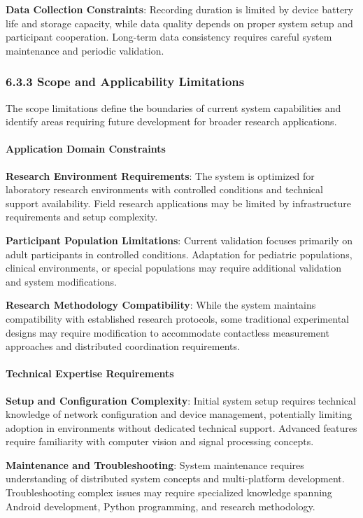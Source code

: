 \documentclass[11pt,a4paper]{article}
\begin{document}
\textbf{Data Collection Constraints}: Recording duration is limited by device battery life and storage capacity, while data
quality depends on proper system setup and participant cooperation. Long-term data consistency requires careful system
maintenance and periodic validation.

\subsubsection{6.3.3 Scope and Applicability Limitations}

The scope limitations define the boundaries of current system capabilities and identify areas requiring future
development for broader research applications.

\paragraph{Application Domain Constraints}

\textbf{Research Environment Requirements}: The system is optimized for laboratory research environments with controlled
conditions and technical support availability. Field research applications may be limited by infrastructure requirements
and setup complexity.

\textbf{Participant Population Limitations}: Current validation focuses primarily on adult participants in controlled
conditions. Adaptation for pediatric populations, clinical environments, or special populations may require additional
validation and system modifications.

\textbf{Research Methodology Compatibility}: While the system maintains compatibility with established research protocols,
some traditional experimental designs may require modification to accommodate contactless measurement approaches and
distributed coordination requirements.

\paragraph{Technical Expertise Requirements}

\textbf{Setup and Configuration Complexity}: Initial system setup requires technical knowledge of network configuration and
device management, potentially limiting adoption in environments without dedicated technical support. Advanced features
require familiarity with computer vision and signal processing concepts.

\textbf{Maintenance and Troubleshooting}: System maintenance requires understanding of distributed system concepts and
multi-platform development. Troubleshooting complex issues may require specialized knowledge spanning Android
development, Python programming, and research methodology.
\end{document}
